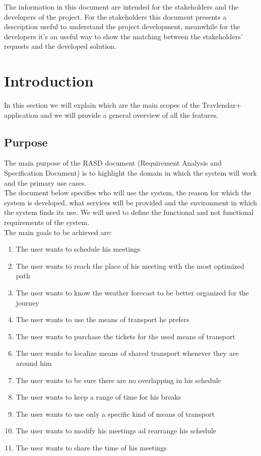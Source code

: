\documentclass[numbers=noenddot, 12pt, a4paper, oneside]{scrbook}
\begin{document}
The information in this document are intended for the stakeholders and the developers of the project. For the stakeholders this document presents a description useful to understand the project development, meanwhile for the developers it’s an useful way to show the matching between the stakeholders’ requests and the developed solution.

\newpage

\chapter{Introduction}

In this section we will explain which are the main scopes of the Travlendar+ application and we will provide a general overview of all the features.

\section{Purpose}

The main purpose of the RASD document (Requirement Analysis and Specification Document) is to highlight the domain in which the system will work and the primary use cases.\\

The document below specifies who will use the system, the reason for which the system is developed, what services will be provided and the environment in which the system finds its use.
We will need to define the functional and not functional requirements of the system. \\

The main goals to be achieved are:
\begin{enumerate}
	\item The user wants to schedule his meetings
	\item The user wants to reach the place of his meeting with the most optimized path
	\item The user wants to know the weather forecast to be better organized for the journey
	\item The user wants to use the means of transport he prefers
	\item The user wants to purchase the tickets for the used means of transport 
	\item The user wants to localize means of shared transport whenever they are around him
	\item The user wants to be sure there are no overlapping in his schedule
	\item The user wants to keep a range of time for his breaks
	\item The user wants to use only a specific kind of means of transport
	\item The user wants to modify his meetings ad rearrange his schedule 
	\item The user wants to share the time of his meetings
\end{enumerate}
\end{document}
